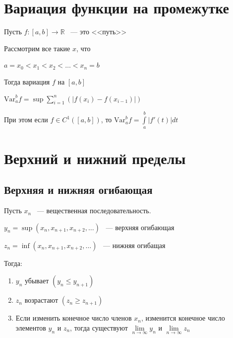 \documentclass{article}
\begin{document}
    \newpage
    
    \section{Вариация функции на промежутке}
    
        Пусть $f: [a, b] \rightarrow \mathbb{R}$ ~--- это <<путь>>
        
        Рассмотрим все такие $x$, что
        
        $a = x_0 < x_1 < x_2 < \ldots < x_n = b$
        
        Тогда вариация $f$ на $[a, b]$
        
        $\mathrm{Var}^b_a f = \sup \sum\limits^n_{i = 1} \left( \left| f(x_i) - f(x_{i - 1}) \right| \right)$
        
        При этом если $f \in C^1 \left([a, b]\right)$, то $\mathrm{Var}^b_a f = \int\limits^b_a |f'(t)| dt$
    
    \newpage
    
    \section{Верхний и нижний пределы}
    
        \subsection{Верхняя и нижняя огибающая}
        
            Пусть $x_n$ ~--- вещественная последовательность.
            
            $y_n = \sup (x_n, x_{n + 1}, x_{n + 2}, \ldots)$ ~--- верхняя огибающая
            
            $z_n = \inf (x_n, x_{n + 1}, x_{n + 2}, \ldots)$ ~--- нижняя огибащая
            
            Тогда:
            
            \begin{enumerate}
            
                \item $y_n$ убывает $(y_n \leq y_{n + 1})$
                
                \item $z_n$ возрастают $(z_n \geq z_{n + 1})$
            
                \item Если изменить конечное число членов $x_n$, изменится конечное число элементов $y_n$ и $z_n$, тогда существуют $\lim\limits_{n \rightarrow \infty} y_n$ и $\lim\limits_{n \rightarrow \infty} z_n$
            
            \end{enumerate}
            
\end{document}
